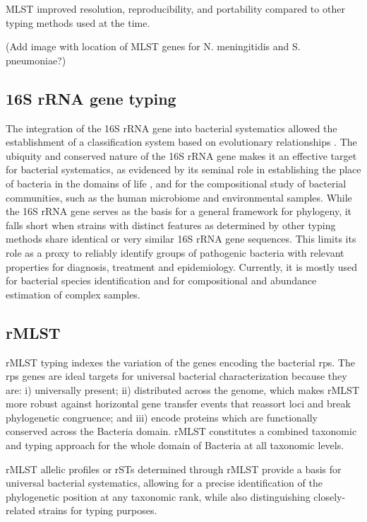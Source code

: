 \ac{MLST} improved resolution, reproducibility, and portability compared to other typing methods used at the time.

(Add image with location of MLST genes for N. meningitidis and S. pneumoniae?)

\subsection{16S rRNA gene typing}

The integration of the 16S \ac{rRNA} gene into bacterial systematics allowed the establishment of a classification system based on evolutionary relationships \cite{jolley_ribosomal_2012, woese_towards_1990}. The ubiquity and conserved nature of the 16S \ac{rRNA} gene makes it an effective target for bacterial systematics, as evidenced by its seminal role in establishing the place of bacteria in the domains of life \cite{woese_bacterial_1987}, and for the compositional study of bacterial communities, such as the human microbiome and environmental samples. While the 16S \ac{rRNA} gene serves as the basis for a general framework for phylogeny, it falls short when strains with distinct features as determined by other typing methods share identical or very similar 16S \ac{rRNA} gene sequences. This limits its role as a proxy to reliably identify groups of pathogenic bacteria with relevant properties for diagnosis, treatment and epidemiology. Currently, it is mostly used for bacterial species identification and for compositional and abundance estimation of complex samples.

\subsection{rMLST}

\ac{rMLST} typing indexes the variation of the genes encoding the bacterial \ac{rps}. The \ac{rps} genes are ideal targets for universal bacterial characterization because they are: i) universally present; ii) distributed across the genome, which makes \ac{rMLST} more robust against horizontal gene transfer events that reassort loci and break phylogenetic congruence; and iii) encode proteins which are functionally conserved across the Bacteria domain. \ac{rMLST} constitutes a combined taxonomic and typing approach for the whole domain of Bacteria at all taxonomic levels.

\ac{rMLST} allelic profiles or \ac{rSTs} determined through \ac{rMLST} provide a basis for universal bacterial systematics, allowing for a precise identification of the phylogenetic position at any taxonomic rank, while also distinguishing closely-related strains for typing purposes. 

